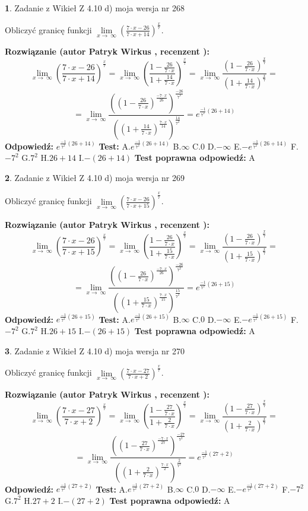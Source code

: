 \documentclass[12pt, a4paper]{article}
\theoremstyle{definition} %
\newtheorem{zad}{}
\newcommand{\zadStart}[1]{\begin{zad}#1\newline}
\newcommand{\zadStop}{\end{zad}}
\newcommand{\rozwStart}[2]{\noindent \textbf{Rozwiązanie (autor #1 , recenzent #2): }\newline}
\newcommand{\rozwStop}{\newline}
\newcommand{\odpStart}{\noindent \textbf{Odpowiedź:}\newline}
\newcommand{\odpStop}{\newline}
\newcommand{\testStart}{\noindent \textbf{Test:}\newline}
\newcommand{\testStop}{\newline}
\newcommand{\kluczStart}{\noindent \textbf{Test poprawna odpowiedź:}\newline}
\newcommand{\kluczStop}{\newline}
\begin{document}
\zadStart{Zadanie z Wikieł Z 4.10 d) moja wersja nr 268}


Obliczyć granicę funkcji  $\lim\limits_{x\to\ \infty}(\frac{7\cdot x-26}{7\cdot x+14})^{\frac{x}{7}}$.
\zadStop
\rozwStart{Patryk Wirkus}{}
$$\lim\limits_{x\to\ \infty}(\frac{7\cdot x-26}{7\cdot x+14})^{\frac{x}{7}} = \lim\limits_{x\to\ \infty}(\frac{1-\frac{26}{7\cdot x}}{1+\frac{14}{7\cdot x}})^{\frac{x}{7}}=\lim\limits_{x\to\ \infty}\frac{(1-\frac{26}{7\cdot x})^{\frac{x}{7}}}{(1+\frac{14}{7\cdot x})^{\frac{x}{7}}}=$$
$$=\lim\limits_{x\to\ \infty}\frac{((1-\frac{26}{7\cdot x})^{\frac{-7\cdot x}{26}})^{\frac{-26}{7^{2}}}}{((1+\frac{14}{7\cdot x})^{\frac{7\cdot x}{14}})^{\frac{14}{7^{2}}}}=e^{\frac{-1}{7^{2}}(26+14)}$$
\rozwStop
\odpStart
$e^{\frac{-1}{7^{2}}(26+14)}$
\odpStop
\testStart
A.$e^{\frac{-1}{7^{2}}(26+14)}$ B.$\infty$ C.$0$ D.$-\infty$ E.$-e^{\frac{-1}{7^{2}}(26+14)}$
F.$-7^{2}$ G.$7^{2}$
H.$26+14$
I.$-(26+14)$
\testStop
\kluczStart
A
\kluczStop



\zadStart{Zadanie z Wikieł Z 4.10 d) moja wersja nr 269}


Obliczyć granicę funkcji  $\lim\limits_{x\to\ \infty}(\frac{7\cdot x-26}{7\cdot x+15})^{\frac{x}{7}}$.
\zadStop
\rozwStart{Patryk Wirkus}{}
$$\lim\limits_{x\to\ \infty}(\frac{7\cdot x-26}{7\cdot x+15})^{\frac{x}{7}} = \lim\limits_{x\to\ \infty}(\frac{1-\frac{26}{7\cdot x}}{1+\frac{15}{7\cdot x}})^{\frac{x}{7}}=\lim\limits_{x\to\ \infty}\frac{(1-\frac{26}{7\cdot x})^{\frac{x}{7}}}{(1+\frac{15}{7\cdot x})^{\frac{x}{7}}}=$$
$$=\lim\limits_{x\to\ \infty}\frac{((1-\frac{26}{7\cdot x})^{\frac{-7\cdot x}{26}})^{\frac{-26}{7^{2}}}}{((1+\frac{15}{7\cdot x})^{\frac{7\cdot x}{15}})^{\frac{15}{7^{2}}}}=e^{\frac{-1}{7^{2}}(26+15)}$$
\rozwStop
\odpStart
$e^{\frac{-1}{7^{2}}(26+15)}$
\odpStop
\testStart
A.$e^{\frac{-1}{7^{2}}(26+15)}$ B.$\infty$ C.$0$ D.$-\infty$ E.$-e^{\frac{-1}{7^{2}}(26+15)}$
F.$-7^{2}$ G.$7^{2}$
H.$26+15$
I.$-(26+15)$
\testStop
\kluczStart
A
\kluczStop



\zadStart{Zadanie z Wikieł Z 4.10 d) moja wersja nr 270}


Obliczyć granicę funkcji  $\lim\limits_{x\to\ \infty}(\frac{7\cdot x-27}{7\cdot x+2})^{\frac{x}{7}}$.
\zadStop
\rozwStart{Patryk Wirkus}{}
$$\lim\limits_{x\to\ \infty}(\frac{7\cdot x-27}{7\cdot x+2})^{\frac{x}{7}} = \lim\limits_{x\to\ \infty}(\frac{1-\frac{27}{7\cdot x}}{1+\frac{2}{7\cdot x}})^{\frac{x}{7}}=\lim\limits_{x\to\ \infty}\frac{(1-\frac{27}{7\cdot x})^{\frac{x}{7}}}{(1+\frac{2}{7\cdot x})^{\frac{x}{7}}}=$$
$$=\lim\limits_{x\to\ \infty}\frac{((1-\frac{27}{7\cdot x})^{\frac{-7\cdot x}{27}})^{\frac{-27}{7^{2}}}}{((1+\frac{2}{7\cdot x})^{\frac{7\cdot x}{2}})^{\frac{2}{7^{2}}}}=e^{\frac{-1}{7^{2}}(27+2)}$$
\rozwStop
\odpStart
$e^{\frac{-1}{7^{2}}(27+2)}$
\odpStop
\testStart
A.$e^{\frac{-1}{7^{2}}(27+2)}$ B.$\infty$ C.$0$ D.$-\infty$ E.$-e^{\frac{-1}{7^{2}}(27+2)}$
F.$-7^{2}$ G.$7^{2}$
H.$27+2$
I.$-(27+2)$
\testStop
\kluczStart
A
\kluczStop
\end{document}
